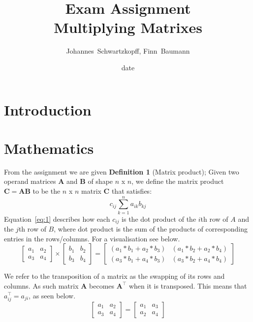 \documentclass[12pt, a4paper]{article}
\title{%
  Exam Assignment \\
  \large Multiplying Matrixes \\}
\author{Johannes~Schwartzkopff, Finn~Baumann }
\date{date}
\begin{document}
\maketitle

\section{Introduction}

\section{Mathematics}
\label{sec:mathematics}

From the assignment we are given \textbf{Definition 1} (Matrix product); Given two operand matrices $\mathbf{A}$ and $\mathbf{B}$ of shape $n$ x $n$, we define the matrix product $\mathbf{C} = \mathbf{AB}$ to be the $n$ x $n$ matrix $\mathbf{C}$ that satisfies:
\begin{equation}
    c_{ij}\sum_{k=1}^{n} a_{ik}b_{kj}
    \label{eq:1}
\end{equation}
Equation~\ref{eq:1} describes how each $c_{ij}$ is the dot product of the $i$th row of $A$ and the $j$th row of $B$, where dot product is the sum of the products of corresponding entries in the rows/columns. For a visualisation see below.
  $$
     \begin{bmatrix}
         a_1 & a_2\\ 
         a_3 & a_4 
     \end{bmatrix}
     \times
     \begin{bmatrix}
         b_1 & b_2\\ 
         b_3 & b_4  
     \end{bmatrix}
      =
     \begin{bmatrix}
         (a_1*b_1+a_2*b_3) & (a_1*b_2+a_2*b_4)\\ 
         (a_3*b_1+a_4*b_3) & (a_3*b_2+a_4*b_4)   
     \end{bmatrix}
  $$
\bigskip

We refer to the transposition of a matrix as the swapping of its rows and columns. As such matrix $\mathbf{A}$ becomes $\mathbf{A}^\top$ when it is transposed. This means that $a^{\top}_{ij}=a_{ji}$, as seen below.
  $$
     \begin{bmatrix}
         a_1 & a_2\\ 
         a_3 & a_4 
     \end{bmatrix}
     =
     \begin{bmatrix}
     a_1 & a_3\\
     a_2 & a_4
     \end{bmatrix}
 $$ 
\end{document}
